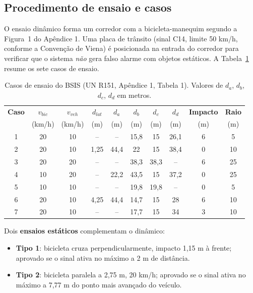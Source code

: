\documentclass[11pt,a4paper]{article}
\begin{document}
\subsection{Procedimento de ensaio e casos}

O ensaio dinâmico forma um corredor com a bicicleta-manequim segundo a Figura~1
do Apêndice 1. Uma placa de trânsito (sinal C14, limite 50 km/h, conforme a
Convenção de Viena) é posicionada na entrada do corredor para verificar que o
sistema \emph{não} gera falso alarme com objetos estáticos. A
Tabela~\ref{tab:tc151} resume os sete casos de ensaio.

\begin{table}[H]
\centering
\caption{Casos de ensaio do BSIS (UN R151, Apêndice 1, Tabela 1). Valores de
$d_a$, $d_b$, $d_c$, $d_d$ em metros.}
\label{tab:tc151}
\small
\begin{tabular}{cccccccccc}
\toprule
\textbf{Caso} & \textbf{$v_{bic}$} & \textbf{$v_{veh}$} & \textbf{$d_{lat}$} &
\textbf{$d_a$} & \textbf{$d_b$} & \textbf{$d_c$} & \textbf{$d_d$} &
\textbf{Impacto} & \textbf{Raio} \\
& (km/h) & (km/h) & (m) & (m) & (m) & (m) & (m) & (m) & (m) \\
\midrule
1 & 20 & 10 & --   & --   & 15,8 & 15   & 26,1 & 6 & 5 \\
2 & 20 & 10 & 1,25 & 44,4 & 22   & 15   & 38,4 & 0 & 10 \\
3 & 20 & 20 & --   & --   & 38,3 & 38,3 & --   & 6 & 25 \\
4 & 10 & 20 & --   & 22,2 & 43,5 & 15   & 37,2 & 0 & 25 \\
5 & 10 & 10 & --   & --   & 19,8 & 19,8 & --   & 0 & 5 \\
6 & 20 & 10 & 4,25 & 44,4 & 14,7 & 15   & 28   & 6 & 10 \\
7 & 20 & 10 & --   & --   & 17,7 & 15   & 34   & 3 & 10 \\
\bottomrule
\end{tabular}
\end{table}

Dois \textbf{ensaios estáticos} complementam o dinâmico:
\begin{itemize}[leftmargin=1.4em,itemsep=2pt]
  \item \textbf{Tipo 1}: bicicleta cruza perpendicularmente, impacto 1,15 m à
        frente; aprovado se o sinal ativa no máximo a 2 m de distância.
  \item \textbf{Tipo 2}: bicicleta paralela a 2,75 m, 20 km/h; aprovado se o
        sinal ativa no máximo a 7,77 m do ponto mais avançado do veículo.
\end{itemize}
\end{document}
